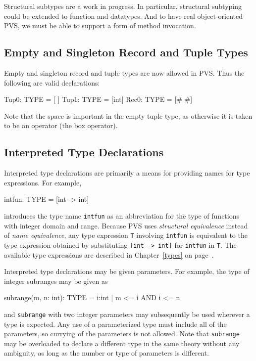 Structural subtypes are a work in progress.  In particular, structural
subtyping could be extended to function and datatypes.  And to have
real object-oriented PVS, we must be able to support a form of method
invocation.


\subsection{Empty and Singleton Record and Tuple Types}

Empty and singleton record and tuple types are now allowed in PVS.
Thus the following are valid declarations:
\begin{pvsex}
Tup0: TYPE = [ ]
Tup1: TYPE = [int]
Rec0: TYPE = [# #]
\end{pvsex}
Note that the space is important in the empty tuple type, as otherwise
it is taken to be an operator (the box operator).


\subsection{Interpreted Type Declarations}

Interpreted type declarations are primarily a means for providing names
for type expressions.  For example,
\begin{pvsex}
  intfun: TYPE = [int -> int]
\end{pvsex}
%
introduces the type name \texttt{intfun} as an abbreviation for the type
of functions with integer domain and range.  Because PVS uses
\emph{structural equivalence} instead of
\emph{name equivalence}, any type expression
\texttt{T} involving \texttt{intfun} is equivalent to the type expression
obtained by substituting \texttt{[int -> int]} for \texttt{intfun} in
\texttt{T}.  The available type expressions are described in
Chapter~\ref{types} on page~\pageref{types}.

Interpreted type declarations may be given
parameters. For example, the type of
integer subranges may be given as
\begin{pvsex}
  subrange(m, n: int): TYPE = \setb{}i:int | m <= i AND i <= n\sete
\end{pvsex}
and \texttt{subrange} with two integer parameters may subsequently be used
wherever a type is expected.  Any use of a parameterized type must include
all of the parameters, so currying of the parameters is not allowed.  Note
that \texttt{subrange} may be overloaded to declare a different type in
the same theory without any ambiguity, as long as the number or type of
parameters is different.

